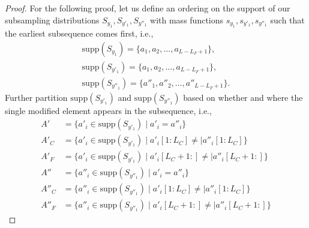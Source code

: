 \begin{proof}
    For the following proof, let us define an ordering on the support of our subsampling distributions
    $S_{y_1}, S_{y'_1}, S_{y''_1}$ with mass functions $s_{y_1}, s_{y'_1}, s_{y''_1}$  such that the earliest subsequence comes first, i.e.,
    \begin{align*}
        \mathrm{supp}(S_{y_1}) = \{a_1, a_2, \dots, a_{L - L_F + 1}\},
        \\
        \mathrm{supp}(S_{y'_1}) = \{a_1, a_2, \dots, a_{L - L_F + 1}\},
        \\
        \mathrm{supp}(S_{y''_1}) = \{a''_1, a''_2, \dots, a''_{L - L_F + 1}\}.
    \end{align*}
    Further partition $\mathrm{supp}(S_{y'_1})$ and $\mathrm{supp}(S_{y''_1})$ based on whether and where the single modified element appears in the subsequence, i.e.,
    \begin{align*}
        A' &= \{a'_i \in \mathrm{supp}(S_{y'_1}) \mid a'_i = a''_i\} \\
        A'_C  &= \{a'_i \in \mathrm{supp}(S_{y'_1}) \mid a'_i[1:L_C] \neq \mid a''_i[1:L_C] \} \\
        A'_F & = \{a'_i \in \mathrm{supp}(S_{y'_1}) \mid a'_i[L_C + 1 :] \neq \mid a''_i[L_C + 1 : ] \} \\
        A'' &= \{a''_i \in \mathrm{supp}(S_{y''_1}) \mid a'_i = a''_i\} \\
        A''_C  &= \{a''_i \in \mathrm{supp}(S_{y''_1}) \mid a'_i[1:L_C] \neq \mid a''_i[1:L_C] \} \\
        A''_F & = \{a''_i \in \mathrm{supp}(S_{y''_1}) \mid a'_i[L_C + 1 :] \neq \mid a''_i[L_C + 1 : ] \}
    \end{align*}


\end{proof}
